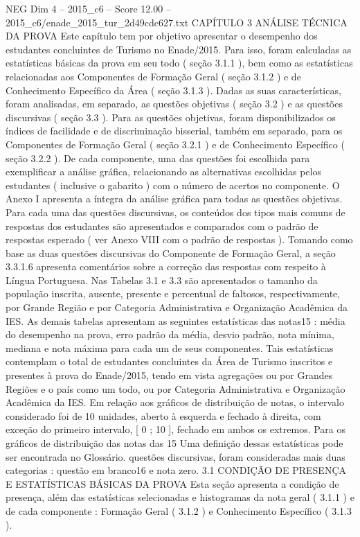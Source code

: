 \begin{textsample}{NEG Dim 4 – 2015\_c6 – Score 12.00 – 2015\_c6/enade\_2015\_tur\_2d49cdc627.txt}  \label{ex:f4_neg_337}
CAPÍTULO 3 ANÁLISE TÉCNICA DA PROVA Este capítulo tem por objetivo apresentar o desempenho dos estudantes concluintes de Turismo no Enade/2015.
Para isso, foram calculadas as estatísticas básicas da prova em seu todo ( seção 3.1.1 ), bem como as estatísticas relacionadas aos Componentes de Formação Geral ( seção 3.1.2 ) e de Conhecimento Específico da Área ( seção 3.1.3 ).
Dadas as suas características, foram analisadas, em separado, as questões objetivas ( seção 3.2 ) e as questões discursivas ( seção 3.3 ).
Para as questões objetivas, foram disponibilizados os índices de facilidade e de discriminação bisserial, também em separado, para os Componentes de Formação Geral ( seção 3.2.1 ) e de Conhecimento Específico ( seção 3.2.2 ).
De cada componente, uma das questões foi escolhida para exemplificar a análise gráfica, relacionando as alternativas escolhidas pelos estudantes ( inclusive o gabarito ) com o número de acertos no componente.
O Anexo I apresenta a íntegra da análise gráfica para todas as questões objetivas.
Para cada uma das questões discursivas, os conteúdos dos tipos mais comuns de respostas dos estudantes são apresentados e comparados com o padrão de respostas esperado ( ver Anexo VIII com o padrão de respostas ).
Tomando como base as duas questões discursivas do Componente de Formação Geral, a seção 3.3.1.6 apresenta comentários sobre a correção das respostas com respeito à Língua Portuguesa.
Nas Tabelas 3.1 e 3.3 são apresentados o tamanho da população inscrita, ausente, presente e percentual de faltosos, respectivamente, por Grande Região e por Categoria Administrativa e Organização Acadêmica da IES.
As demais tabelas apresentam as seguintes estatísticas das notas15 : média do desempenho na prova, erro padrão da média, desvio padrão, nota mínima, mediana e nota máxima para cada um de seus componentes.
Tais estatísticas contemplam o total de estudantes concluintes da Área de Turismo inscritos e presentes à prova do Enade/2015, tendo em vista agregações ou por Grandes Regiões e o país como um todo, ou por Categoria Administrativa e Organização Acadêmica da IES.
Em relação aos gráficos de distribuição de notas, o intervalo considerado foi de 10 unidades, aberto à esquerda e fechado à direita, com exceção do primeiro intervalo, [ 0 ; 10 ], fechado em ambos os extremos.
Para os gráficos de distribuição das notas das 15 Uma definição dessas estatísticas pode ser encontrada no Glossário. questões discursivas, foram consideradas mais duas categorias : questão em branco16 e nota zero. 3.1 CONDIÇÃO DE PRESENÇA E ESTATÍSTICAS BÁSICAS DA PROVA Esta seção apresenta a condição de presença, além das estatísticas selecionadas e histogramas da nota geral ( 3.1.1 ) e de cada componente : Formação Geral ( 3.1.2 ) e Conhecimento Específico ( 3.1.3 ).

\end{textsample}
